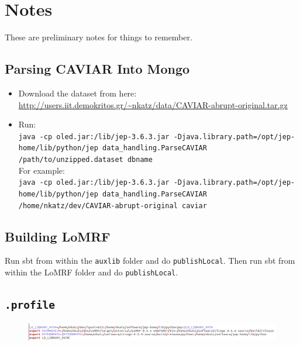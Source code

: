 \documentclass[12pt]{article}
\begin{document}
\section*{Notes}

These are preliminary notes for things to remember.

\subsection*{Parsing CAVIAR Into Mongo}
\begin{itemize}
\item Download the dataset from here: \scriptsize
 \url{http://users.iit.demokritos.gr/~nkatz/data/CAVIAR-abrupt-original.tar.gz} \normalsize 
\item Run: \\
\scriptsize \texttt{java -cp oled.jar:/lib/jep-3.6.3.jar -Djava.library.path=/opt/jep-home/lib/python/jep data\_handling.ParseCAVIAR /path/to/unzipped.dataset dbname} \normalsize \\
For example: \\
\scriptsize \texttt{java -cp oled.jar:/lib/jep-3.6.3.jar -Djava.library.path=/opt/jep-home/lib/python/jep data\_handling.ParseCAVIAR /home/nkatz/dev/CAVIAR-abrupt-original caviar} \normalsize
\end{itemize}

\subsection*{Building LoMRF}
Run sbt from within the \texttt{auxlib} folder and do \texttt{publishLocal}. Then run sbt from within the LoMRF folder and do \texttt{publishLocal}.

\subsection*{\texttt{.profile}}
\begin{figure}[h]
\centering
\includegraphics[width=\textwidth]{./figures/profile-example.png}
\end{figure} 
\end{document}
